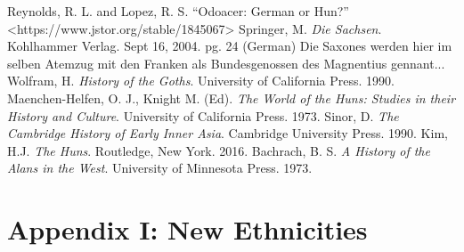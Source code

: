 \documentclass{article}
\begin{document}
\begin{thebibliography}{99}
		Reynolds, R. L. and Lopez, R. S. “Odoacer: German or Hun?” <https://www.jstor.org/stable/1845067>
		Springer, M. \textit{Die Sachsen}. Kohlhammer Verlag. Sept 16, 2004. pg. 24 (German)
		\newline\tiny Die Saxones werden hier im selben Atemzug mit den Franken als Bundesgenossen des Magnentius gennant... \normalsize
		Wolfram, H. \textit{History of the Goths}. University of California Press. 1990.
		Maenchen-Helfen, O. J., Knight M. (Ed). \textit{The World of the Huns: Studies in their History and Culture}. University of California Press. 1973.
		Sinor, D. \textit{The Cambridge History of Early Inner Asia}. Cambridge University Press. 1990.
		Kim, H.J. \textit{The Huns}. Routledge, New York. 2016.
		Bachrach, B. S. \textit{A History of the Alans in the West}. University of Minnesota Press. 1973.
	\end{thebibliography}
	
	\newpage
	
	\section{Appendix I: New Ethnicities}
	\label{sec:appendix_new_ethnicities}
	
\end{document}
